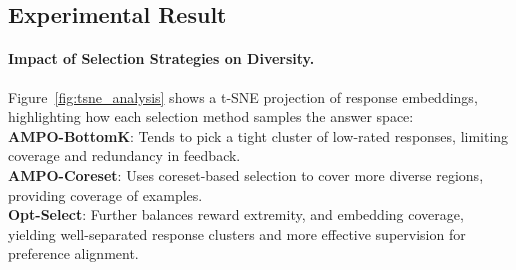 




\subsection{Experimental Result}

\paragraph{Impact of Selection Strategies on Diversity.}
Figure~\ref{fig:tsne_analysis} shows a t-SNE projection of response embeddings, highlighting how each selection method samples the answer space:\\
\textbf{AMPO-BottomK}: Tends to pick a tight cluster of low-rated responses, limiting coverage and redundancy in feedback.\\
\textbf{AMPO-Coreset}: Uses coreset-based selection to cover more diverse regions, providing coverage of examples.\\
\textbf{Opt-Select}: Further balances reward extremity, and embedding coverage, yielding well-separated response clusters and more effective supervision for preference alignment.


